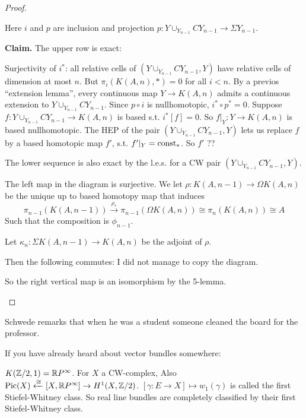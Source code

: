 \documentclass[language=english]{TemplateLecture}
\begin{document}
\begin{proof}
\begin{description}
        Here \(i\) and \(p\) are inclusion and projection \(p\colon Y\cup_{Y_{n-1}} C Y_{n-1}\to \Sigma Y_{n-1}\).

        \textbf{Claim.} The upper row is exact:
        
        Surjectivity of \(i^*\): all relative cells of \((Y\cup_{Y_{n-1}} C Y_{n-1}, Y)\) have relative cells of dimension at most \(n\). But \(\pi_i(K(A,n), *) = 0\) for all \(i < n\). By a previos \enquote{extension lemma}, every continuous map \(Y\to K(A,n)\) admits a continuous extension to \(Y\cup_{Y_{n-1}} CY_{n-1}\). Since \(p\circ i\) is nullhomotopic, \(i^* \circ p^* = 0\). 
        Suppose \(f\colon Y\cup_{Y_{n-1}} C Y_{n-1}\to K(A,n)\) is based s.t. \(i^*[f] = 0\). So \(f\rvert_{Y}\colon Y\to K(A,n)\) is based nullhomotopic. The HEP of the pair \((Y\cup_{Y_{n-1}} CY_{n-1}, Y)\) lets us replace \(f\) by a based homotopic map \(f'\), s.t. \(f'\rvert_Y = \operatorname{const}_*\). So \(f'\) ??

        The lower sequence is also exact by the l.e.s. for a CW pair \((Y\cup_{Y_{n-1}} C Y_{n-1}, Y)\).

        The left map in the diagram is surjective. We let \(\rho\colon K(A,n-1)\to \Omega K(A,n)\) be the unique up to based homotopy map that induces
        \[\pi_{n-1}(K(A,n-1)) \xrightarrow{\rho_*} \pi_{n-1}(\Omega K(A,n))\cong \pi_n(K(A,n)) \cong A \]
        Such that the composition is \(\phi_{n-1}\).

        Let \(\kappa_n\colon \Sigma K(A, n-1)\to K(A,n)\) be the adjoint of \(\rho\).

        Then the following commutes: I did not manage to copy the diagram.

        So the right vertical map is an isomorphism by the 5-lemma.
    \end{description}

\end{proof}


Schwede remarks that when he was a student someone cleaned the board for the professor.

\begin{example}
    If you have already heard about vector bundles somewhere:

    \(K(\mathbb{Z}/2, 1) = \mathbb{R} P^{\infty}\). For \(X\) a CW-complex, Also \(\mathrm{Pic}(X) \xleftarrow{\cong} [X, \mathbb{R} P^\infty] \to H^1(X,\mathbb{Z} /2)\). \([\gamma\colon E\to X] \mapsto w_1(\gamma)\) is called the first Stiefel-Whitney class. So real line bundles are completely classified by their first Stiefel-Whitney class.
\end{example}
\end{document}
